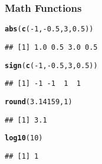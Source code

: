 \documentclass[12pt]{beamer}\usepackage[]{graphicx}\usepackage[]{color}
\makeatletter
\newcommand{\hlnum}[1]{\textcolor[rgb]{0.686,0.059,0.569}{#1}}%
\newcommand{\hlopt}[1]{\textcolor[rgb]{0,0,0}{#1}}%
\newcommand{\hlstd}[1]{\textcolor[rgb]{0.345,0.345,0.345}{#1}}%
\newcommand{\hlkwd}[1]{\textcolor[rgb]{0.737,0.353,0.396}{\textbf{#1}}}%
\newenvironment{kframe}{%
 \def\at@end@of@kframe{}%
 \ifinner\ifhmode%
  \def\at@end@of@kframe{\end{minipage}}%
  \begin{minipage}{\columnwidth}%
 \fi\fi%
 \def\FrameCommand##1{\hskip\@totalleftmargin \hskip-\fboxsep
 \colorbox{shadecolor}{##1}\hskip-\fboxsep
     \hskip-\linewidth \hskip-\@totalleftmargin \hskip\columnwidth}%
 \MakeFramed {\advance\hsize-\width
   \@totalleftmargin\z@ \linewidth\hsize
   \@setminipage}}%
 {\par\unskip\endMakeFramed%
 \at@end@of@kframe}
\newenvironment{knitrout}{}{} %
\makeatother
\begin{document}
\begin{frame}[fragile]
\frametitle{Math Functions}

\begin{knitrout}\footnotesize
{}\color{fgcolor}\begin{kframe}
\begin{alltt}
\hlkwd{abs}\hlstd{(}\hlkwd{c}\hlstd{(}\hlopt{-}\hlnum{1}\hlstd{,} \hlopt{-}\hlnum{0.5}\hlstd{,} \hlnum{3}\hlstd{,} \hlnum{0.5}\hlstd{))}
\end{alltt}
\begin{verbatim}
## [1] 1.0 0.5 3.0 0.5
\end{verbatim}
\begin{alltt}
\hlkwd{sign}\hlstd{(}\hlkwd{c}\hlstd{(}\hlopt{-}\hlnum{1}\hlstd{,} \hlopt{-}\hlnum{0.5}\hlstd{,} \hlnum{3}\hlstd{,} \hlnum{0.5}\hlstd{))}
\end{alltt}
\begin{verbatim}
## [1] -1 -1  1  1
\end{verbatim}
\begin{alltt}
\hlkwd{round}\hlstd{(}\hlnum{3.14159}\hlstd{,} \hlnum{1}\hlstd{)}
\end{alltt}
\begin{verbatim}
## [1] 3.1
\end{verbatim}
\begin{alltt}
\hlkwd{log10}\hlstd{(}\hlnum{10}\hlstd{)}
\end{alltt}
\begin{verbatim}
## [1] 1
\end{verbatim}
\end{kframe}
\end{knitrout}

\end{frame}


\begin{frame}
\begin{center}
\Huge{}
\end{center}
\end{frame}

\end{document}
